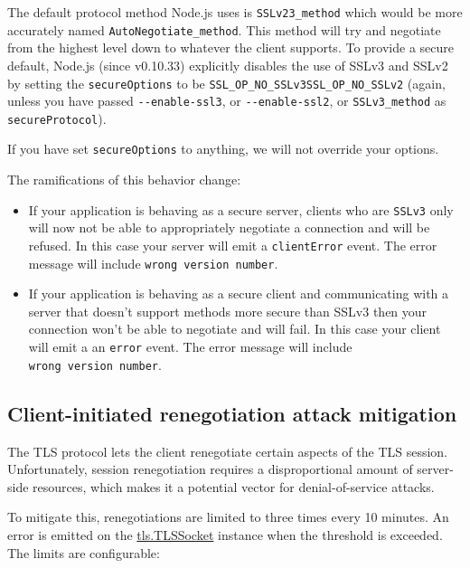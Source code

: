 The default protocol method Node.js uses is \texttt{SSLv23\_method}
which would be more accurately named \texttt{AutoNegotiate\_method}.
This method will try and negotiate from the highest level down to
whatever the client supports. To provide a secure default, Node.js
(since v0.10.33) explicitly disables the use of SSLv3 and SSLv2 by
setting the \texttt{secureOptions} to be
\texttt{SSL\_OP\_NO\_SSLv3\textbar{}SSL\_OP\_NO\_SSLv2} (again, unless
you have passed \texttt{-\/-enable-ssl3}, or \texttt{-\/-enable-ssl2},
or \texttt{SSLv3\_method} as \texttt{secureProtocol}).

If you have set \texttt{secureOptions} to anything, we will not override
your options.

The ramifications of this behavior change:

\begin{itemize}
\itemsep1pt\parskip0pt
\item
  If your application is behaving as a secure server, clients who are
  \texttt{SSLv3} only will now not be able to appropriately negotiate a
  connection and will be refused. In this case your server will emit a
  \texttt{clientError} event. The error message will include
  \texttt{\textquotesingle{}wrong\ version\ number\textquotesingle{}}.
\item
  If your application is behaving as a secure client and communicating
  with a server that doesn't support methods more secure than SSLv3 then
  your connection won't be able to negotiate and will fail. In this case
  your client will emit a an \texttt{error} event. The error message
  will include
  \texttt{\textquotesingle{}wrong\ version\ number\textquotesingle{}}.
\end{itemize}

\subsection{Client-initiated renegotiation attack
mitigation}\label{client-initiated-renegotiation-attack-mitigation}

The TLS protocol lets the client renegotiate certain aspects of the TLS
session. Unfortunately, session renegotiation requires a disproportional
amount of server-side resources, which makes it a potential vector for
denial-of-service attacks.

To mitigate this, renegotiations are limited to three times every 10
minutes. An error is emitted on the
\hyperref[tlsux5fclassux5ftlsux5ftlssocket]{tls.TLSSocket} instance when
the threshold is exceeded. The limits are configurable:

